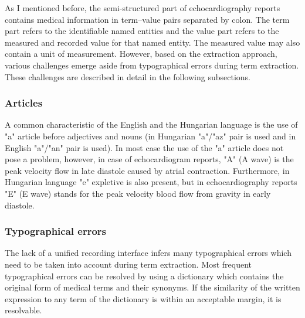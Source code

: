 
\vspace{1.0cm}

As I mentioned before, the semi-structured part of echocardiography reports contains medical information in term–value pairs separated by colon. The term part refers to the identifiable named entities and the value part refers to the measured and recorded value for that named entity. The measured value may also contain a unit of measurement. However, based on the extraction approach, various challenges emerge aside from typographical errors during term extraction. These challenges are described in detail in the following subsections.

\subsubsection*{Articles}

A common characteristic of the English and the Hungarian language is the use of "a" article before adjectives and nouns (in Hungarian "a"/"az" pair is used and in English "a"/"an" pair is used). In most case the use of the "a" article does not pose a problem, however, in case of echocardiogram reports, "A" (A wave) is the peak velocity flow in late diastole caused by atrial contraction. Furthermore, in Hungarian language "e" expletive is also present, but in echocardiography reports "E" (E wave) stands for the peak velocity blood flow from gravity in early diastole.

\subsubsection*{Typographical errors}

The lack of a unified recording interface infers many typographical errors which need to be taken into account during term extraction. Most frequent typographical errors can be resolved by using a dictionary which contains the original form of medical terms and their synonyms. If the similarity of the written expression to any term of the dictionary is within an acceptable margin, it is resolvable.

